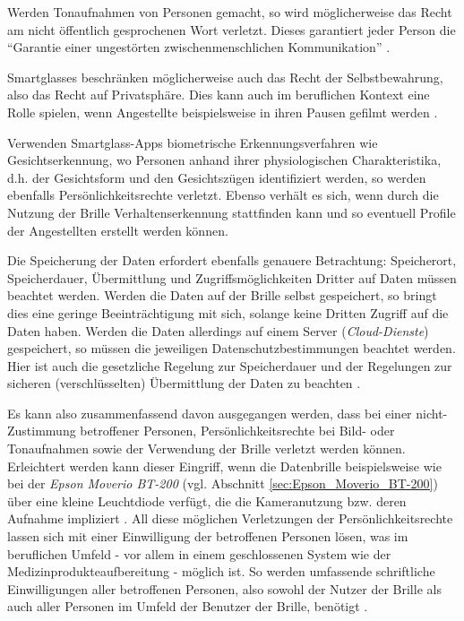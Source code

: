 Werden Tonaufnahmen von Personen gemacht, so wird möglicherweise das Recht am nicht öffentlich gesprochenen Wort verletzt. Dieses garantiert jeder Person die \enquote{Garantie einer ungestörten zwischenmenschlichen Kommunikation} \cite[S.~112]{Schwenke2016}.

Smartglasses beschränken möglicherweise auch das Recht der Selbstbewahrung, also das Recht auf Privatsphäre. Dies kann auch im beruflichen Kontext eine Rolle spielen, wenn Angestellte beispielsweise in ihren Pausen gefilmt werden \cite[S.~114f]{Schwenke2016}.

Verwenden Smartglass-Apps biometrische Erkennungsverfahren wie Gesichtserkennung, wo Personen anhand ihrer physiologischen Charakteristika, d.h. der Gesichtsform und den Gesichtszügen identifiziert werden, so werden ebenfalls Persönlichkeitsrechte verletzt. Ebenso verhält es sich, wenn durch die Nutzung der Brille Verhaltenserkennung stattfinden kann und so eventuell Profile der Angestellten erstellt werden können.

Die Speicherung der Daten erfordert ebenfalls genauere Betrachtung: Speicherort, Speicherdauer, Übermittlung und Zugriffsmöglichkeiten Dritter auf Daten müssen beachtet werden. Werden die Daten auf der Brille selbst gespeichert, so bringt dies eine geringe Beeinträchtigung mit sich, solange keine Dritten Zugriff auf die Daten haben. Werden die Daten allerdings auf einem Server (\emph{Cloud-Dienste}) gespeichert, so müssen die jeweiligen Datenschutzbestimmungen beachtet werden. Hier ist auch die gesetzliche Regelung zur Speicherdauer und der Regelungen zur sicheren (verschlüsselten) Übermittlung der Daten zu beachten \cite[S.~165f]{Schwenke2016}.

Es kann also zusammenfassend davon ausgegangen werden, dass bei einer nicht- Zustimmung betroffener Personen, Persönlichkeitsrechte bei Bild- oder Tonaufnahmen sowie der Verwendung der Brille verletzt werden können. Erleichtert werden kann dieser Eingriff, wenn die Datenbrille beispielsweise wie bei der \emph{Epson Moverio BT-200} (vgl. Abschnitt \ref{sec:Epson_Moverio_BT-200}) über eine kleine Leuchtdiode verfügt, die die Kameranutzung bzw. deren Aufnahme impliziert \cite[S.~161]{Schwenke2016}. All diese möglichen Verletzungen der Persönlichkeitsrechte lassen sich mit einer Einwilligung der betroffenen Personen lösen, was im beruflichen Umfeld - vor allem in einem geschlossenen System wie der Medizinprodukteaufbereitung - möglich ist. So werden umfassende schriftliche Einwilligungen aller betroffenen Personen, also sowohl der Nutzer der Brille als auch aller Personen im Umfeld der Benutzer der Brille, benötigt \cite[S.~139f]{Schwenke2016}.
%
%
